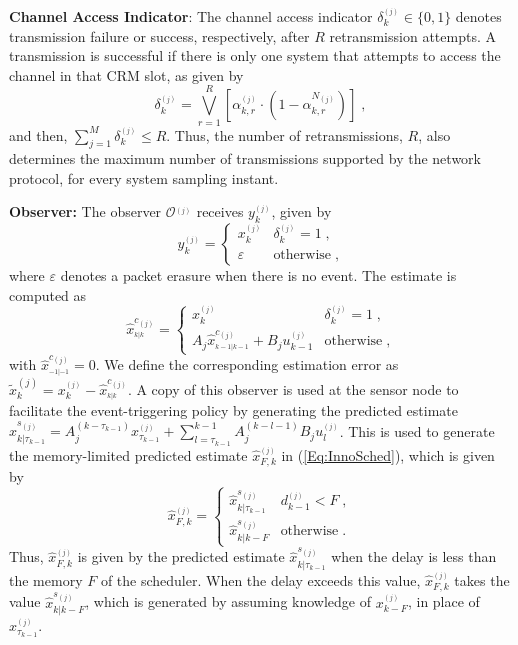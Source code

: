 \documentclass[journal]{IEEEtran}
\begin{document}
\noindent \textbf{Channel Access Indicator}: The channel access indicator $\delta_k^{_{(j)}} \in \{0,1\}$ denotes transmission failure or success, respectively, after $R$ retransmission attempts. A transmission is successful if there is only one system that attempts to access the channel in that CRM slot, as  given by
\begin{equation}
\label{Eq:Delta}
\delta^{_{(j)}}_k = \bigvee_{r=1}^{R} \left [ \alpha^{_{(j)}}_{k,r} \cdot (1-\alpha^{N_{(j)}}_{k,r})  \right ] \; ,
\end{equation}
and then, $\sum_{j=1}^{M} \delta^{_{(j)}}_k \le R$. Thus, the number of retransmissions, $R$, also determines the maximum number of transmissions supported by the network protocol, for every system sampling instant.

\noindent \textbf{Observer:} The observer $\mathcal{O}^{_{(j)}}$ receives $y^{_{(j)}}_k$, given by
\begin{equation} \label{Eq:NLMeas}
y^{_{(j)}}_k = \begin{cases}
x^{_{(j)}}_k & \delta^{_{(j)}}_k = 1 \; , \\
\varepsilon & \textrm{otherwise} \; ,
\end{cases}
\end{equation}
where $\varepsilon$ denotes a packet erasure when there is no event. The estimate is computed as
\begin{equation} \label{Eq:EstO}
\hat{x}^{c_{(j)}}_{^{k|k}} = \begin{cases}
x^{_{(j)}}_k & \delta^{_{(j)}}_k = 1 \; , \\
A_j \hat{x}^{c_{(j)}}_{^{k-1|k-1}} + B_j u^{_{(j)}}_{k-1}  & \textrm{otherwise} \; ,
\end{cases}
\end{equation}
with $\hat{x}^{c_{(j)}}_{^{-1|-1}} = 0$. We define the corresponding estimation error as $\tilde{x}^{{(j)}}_{k} = x^{_{(j)}}_k - \hat{x}^{c_{(j)}}_{^{k|k}}$. A copy of this observer is used at the sensor node to facilitate the event-triggering policy by generating the predicted estimate $\hat{x}^{s_{(j)}}_{k|\tau_{k-1}} = A_j^{(k-\tau_{k-1})} x^{_{(j)}}_{\tau_{k-1}} + \sum_{l=\tau_{k-1}}^{k-1} A_j^{(k-l-1)} B_j u^{_{(j)}}_{l}$. This is used to generate the memory-limited predicted estimate $\hat{x}^{_{(j)}}_{F,k}$ in (\ref{Eq:InnoSched}), which is given by
\begin{equation}
\hat{x}^{_{(j)}}_{F,k} = \begin{cases}
\hat{x}^{s_{(j)}}_{k|\tau_{k-1}} & d^{_{(j)}}_{k-1} < F \; , \\
\hat{x}^{s_{(j)}}_{k|k-F} & \textrm{otherwise} \; .
\end{cases} \label{Eq:PredEst}
\end{equation}
Thus, $\hat{x}^{_{(j)}}_{F,k}$ is given by the predicted estimate $\hat{x}^{s_{(j)}}_{k|\tau_{k-1}}$ when the delay is less than the memory $F$ of the scheduler. When the delay exceeds this value, $\hat{x}^{_{(j)}}_{F,k}$ takes the value $\hat{x}^{s_{(j)}}_{k|k-F}$, which is generated by assuming knowledge of $x^{_{(j)}}_{k-F}$, in place of $x^{_{(j)}}_{\tau_{k-1}}$.
\end{document}
